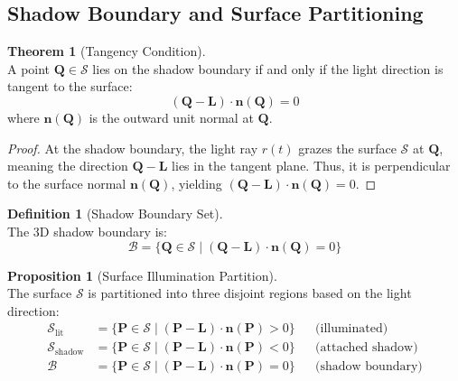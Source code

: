 \documentclass[12pt]{article}
\newcommand{\vect}[1]{\bm{#1}}
\theoremstyle{definition}
\newtheorem{definition}{Definition}[subsection]
\newtheorem{theorem}{Theorem}[subsection]
\newtheorem{proposition}{Proposition}[subsection]
\begin{document}
\subsection{Shadow Boundary and Surface Partitioning} \label{sec:shadow_boundary}

\begin{theorem}[Tangency Condition] \label{thm:tangency} ~\\
A point $\vect{Q} \in \mathcal{S}$ lies on the shadow boundary if and only if the light direction is tangent to the surface:
\begin{equation}
\boxed{(\vect{Q} - \vect{L}) \cdot \vect{n}(\vect{Q}) = 0} \label{eq:tangency}
\end{equation}
where $\vect{n}(\vect{Q})$ is the outward unit normal at $\vect{Q}$.
\end{theorem}

\begin{proof}
At the shadow boundary, the light ray $r(t)$ grazes the surface $\mathcal{S}$ at $\vect{Q}$, meaning the direction $\vect{Q} - \vect{L}$ lies in the tangent plane. Thus, it is perpendicular to the surface normal $\vect{n}(\vect{Q})$, yielding $(\vect{Q} - \vect{L}) \cdot \vect{n}(\vect{Q}) = 0$.
\end{proof}

\begin{definition}[Shadow Boundary Set] \label{def:boundary_set} ~\\
The 3D shadow boundary is:
\begin{equation}
\boxed{\mathcal{B} = \{\vect{Q} \in \mathcal{S} \mid (\vect{Q} - \vect{L}) \cdot \vect{n}(\vect{Q}) = 0\}} \label{eq:boundary_set}
\end{equation}
\end{definition}

\newpage

\begin{proposition}[Surface Illumination Partition] \label{prop:illumination_partition} ~\\
The surface $\mathcal{S}$ is partitioned into three disjoint regions based on the light direction:
\begin{align}
\mathcal{S}_{\text{lit}} &= \{\vect{P} \in \mathcal{S} \mid (\vect{P} - \vect{L}) \cdot \vect{n}(\vect{P}) > 0\} && \text{(illuminated)} \label{eq:lit_region} \\
\mathcal{S}_{\text{shadow}} &= \{\vect{P} \in \mathcal{S} \mid (\vect{P} - \vect{L}) \cdot \vect{n}(\vect{P}) < 0\} && \text{(attached shadow)} \label{eq:shadow_region} \\
\mathcal{B} &= \{\vect{P} \in \mathcal{S} \mid (\vect{P} - \vect{L}) \cdot \vect{n}(\vect{P}) = 0\} && \text{(shadow boundary)} \label{eq:boundary_region}
\end{align}
\end{proposition}
\end{document}
